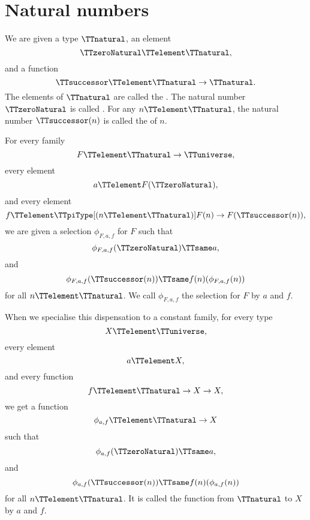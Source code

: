 \documentclass{article}
\begin{document}
\section{Natural numbers}
\label{sec:natural-numbers}

We are given a type $\TTnatural$, an element
\begin{equation*}
  \TTzeroNatural \TTelement \TTnatural,
\end{equation*}
and a function
\begin{equation*}
  \TTsuccessor \TTelement \TTnatural \to \TTnatural.
\end{equation*}
The elements of $\TTnatural$ are called the .  The natural number $\TTzeroNatural$ is called
.  For any $n \TTelement \TTnatural$, the natural
number $\TTsuccessor(n)$ is called the  of $n$.

For every family
\begin{equation*}
  F \TTelement \TTnatural \to \TTuniverse,
\end{equation*}
every element
\begin{equation*}
  a \TTelement F(\TTzeroNatural),
\end{equation*}
and every element
\begin{equation*}
  f \TTelement
  \TTpiType[(n \TTelement \TTnatural)] F(n) \to F(\TTsuccessor(n)),
\end{equation*}
we are given a selection $\phi_{F,a,f}$ for $F$ such that
\begin{equation*}
  \phi_{F,a,f} (\TTzeroNatural) \TTsame a,
\end{equation*}
and
\begin{equation*}
  \phi_{F,a,f} (\TTsuccessor(n)) \TTsame f(n)(\phi_{F,a,f}(n))
\end{equation*}
for all $n \TTelement \TTnatural$.  We call $\phi_{F,a,f}$ the
selection for $F$  by $a$ and $f$.

When we specialise this dispensation to a constant family, for every
type
\begin{equation*}
  X \TTelement \TTuniverse,
\end{equation*}
every element
\begin{equation*}
  a \TTelement X,
\end{equation*}
and every function
\begin{equation*}
  f \TTelement \TTnatural \to X \to X,
\end{equation*}
we get a function
\begin{equation*}
  \phi_{a,f} \TTelement \TTnatural \to X
\end{equation*}
such that
\begin{equation*}
  \phi_{a,f} (\TTzeroNatural) \TTsame a,
\end{equation*}
and
\begin{equation*}
  \phi_{a,f} (\TTsuccessor(n)) \TTsame f(n)(\phi_{a,f}(n))
\end{equation*}
for all $n \TTelement \TTnatural$.  It is called the function from
$\TTnatural$ to $X$  by $a$ and $f$.
\end{document}
